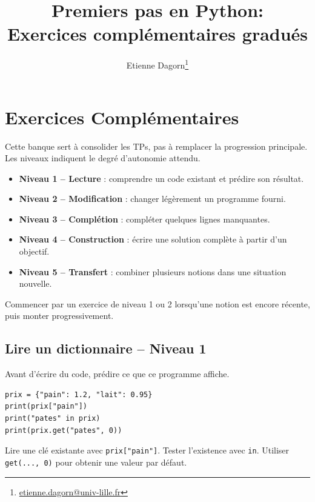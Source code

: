 \documentclass[11pt,a4paper]{article}
\title{\textbf{Premiers pas en Python: \\ Exercices complémentaires gradués}}
\author{Etienne Dagorn\thanks{\href{mailto:etienne.dagorn@univ-lille.fr}{{etienne.dagorn@univ-lille.fr}}}}
\date{}
\begin{document}
\maketitle

\tableofcontents

\newpage



\newpage
\section{Exercices Complémentaires}

\begin{tcolorbox}[title=Mode d'emploi pédagogique]
Cette banque sert à consolider les TPs, pas à remplacer la progression principale. Les niveaux indiquent le degré d'autonomie attendu.
\begin{itemize}
    \item \textbf{Niveau 1 -- Lecture} : comprendre un code existant et prédire son résultat.
    \item \textbf{Niveau 2 -- Modification} : changer légèrement un programme fourni.
    \item \textbf{Niveau 3 -- Complétion} : compléter quelques lignes manquantes.
    \item \textbf{Niveau 4 -- Construction} : écrire une solution complète à partir d'un objectif.
    \item \textbf{Niveau 5 -- Transfert} : combiner plusieurs notions dans une situation nouvelle.
\end{itemize}
Commencer par un exercice de niveau 1 ou 2 lorsqu'une notion est encore récente, puis monter progressivement.
\end{tcolorbox}

\subsection*{Lire un dictionnaire -- Niveau 1}
Avant d'écrire du code, prédire ce que ce programme affiche.
\begin{lstlisting}
prix = {"pain": 1.2, "lait": 0.95}
print(prix["pain"])
print("pates" in prix)
print(prix.get("pates", 0))
\end{lstlisting}
\begin{tcolorbox}[title=Aide]
Lire une clé existante avec \texttt{prix["pain"]}. Tester l'existence avec \texttt{in}. Utiliser \texttt{get(..., 0)} pour obtenir une valeur par défaut.
\end{tcolorbox}
\end{document}
